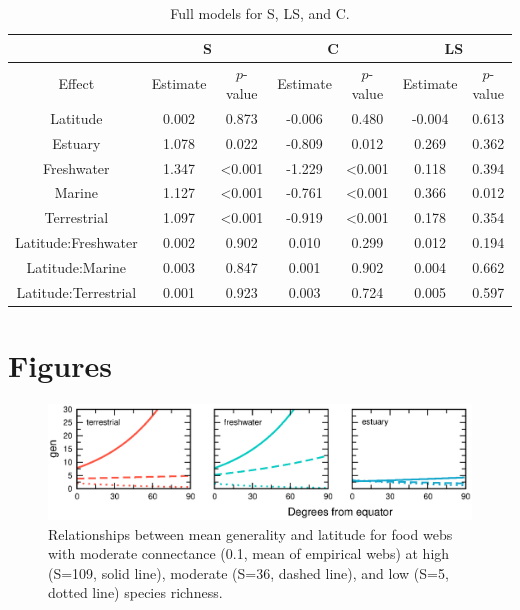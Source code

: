 \documentclass[12pt]{article}
\begin{document}
\begin{center}
\begin{table}[!h]
\caption{Full models for S, LS, and C.}
\label{symbols}
\begin{tabular}{c c c c c c c}
\hline
 & \multicolumn{2}{c}{S} & \multicolumn{2}{c}{C} & \multicolumn{2}{c}{LS} \\
\hline
Effect & Estimate & $p$-value & Estimate & $p$-value & Estimate & $p$-value \\
\hline
Latitude 			& 0.002  & 0.873  & -0.006 & 0.480  & -0.004 & 0.613 \\ 
Estuary 			& 1.078  & 0.022  & -0.809 & 0.012  & 0.269 & 0.362 \\
Freshwater 			& 1.347  & \textless0.001  & -1.229 & \textless0.001 & 0.118 & 0.394 \\
Marine 				& 1.127  & \textless0.001 & -0.761 & \textless0.001 & 0.366 & 0.012 \\
Terrestrial 		& 1.097  & \textless0.001 & -0.919 & \textless0.001 & 0.178 & 0.354\\
Latitude:Freshwater & 0.002  & 0.902  & 0.010  & 0.299  & 0.012 & 0.194\\
Latitude:Marine 	& 0.003  & 0.847  & 0.001  & 0.902  & 0.004 & 0.662 \\
Latitude:Terrestrial & 0.001 & 0.923  & 0.003  & 0.724  & 0.005 & 0.597 \\
\end{tabular}
\end{table}
\end{center}

\newpage

\section*{Figures}

\begin{figure}[!h]
\label{gen_all}
\includegraphics[width=.9\textwidth]{Figures/gen_all.eps}
\caption{Relationships between mean generality and latitude for food webs with moderate connectance (0.1, mean of empirical webs) at high (S=109, solid line), moderate (S=36, dashed line), and low (S=5, dotted line) species richness.}
\end{figure}
\end{document}
